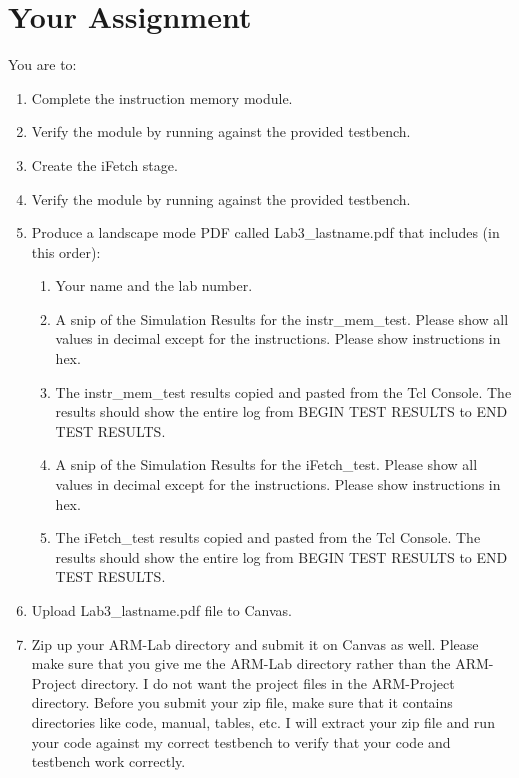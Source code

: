 \section{Your Assignment}
You are to:
\begin{enumerate}
\item Complete the instruction memory module.
\item Verify the module by running against the provided testbench.
\item Create the iFetch stage.
\item Verify the module by running against the provided testbench.
\item Produce a landscape mode PDF called Lab3\_lastname.pdf that includes (in this order):
\begin{enumerate}
\item Your name and the lab number.
\item A snip of the Simulation Results for the instr\_mem\_test.  Please show all values in decimal except for the instructions.  Please show instructions in hex.
\item The instr\_mem\_test results copied and pasted from the Tcl Console.  The results should show the entire log from BEGIN TEST RESULTS to END TEST RESULTS.
\item A snip of the Simulation Results for the iFetch\_test.  Please show all values in decimal except for the instructions.  Please show instructions in hex.  
\item The iFetch\_test results copied and pasted from the Tcl Console.  The results should show the entire log from BEGIN TEST RESULTS to END TEST RESULTS.
\end{enumerate}
\item Upload Lab3\_lastname.pdf file to Canvas.
\item Zip up your ARM-Lab directory and submit it on Canvas as well.  Please make sure that you give me the ARM-Lab directory rather than the ARM-Project directory.  I do not want the project files in the ARM-Project directory.  Before you submit your zip file, make sure that it contains directories like code, manual, tables, etc.  I will extract your zip file and run your code against my correct testbench to verify that your code and testbench work correctly.
\end{enumerate} 